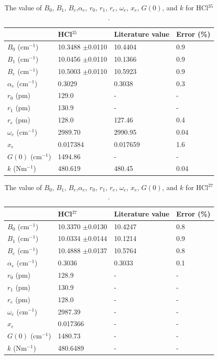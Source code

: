 \documentclass[twocolumn]{article} %
\begin{document}
\begin{table}[h]
    \caption{The value of $B_0$, $B_1$, $B_e$,$\alpha_e$, $r_0$, $r_1$, $r_e$, $\omega_e$, $x_e$, $G(0)$, and $k$ for HCl$^{35}$.}
    \begin{tabular}{L{.7in}C{.7in}C{.7in}C{.7in}}\toprule
          & HCl$^{35}$& Literature value & Error (\%) \\\midrule
        $B_0$ (cm$^{-1}$)& 10.3488 $\pm$0.0110 & 10.4404 \cite{HCl35-37}  & 0.9\\
        $B_1$ (cm$^{-1}$)& 10.0456 $\pm$0.0110& 10.1366 \cite{HCl35-37}& 0.9\\
        $B_e$ (cm$^{-1}$)& 10.5003 $\pm$0.0110& 10.5923 \cite{HCl35-37}& 0.9\\
        $\alpha_e$ (cm$^{-1}$)& 0.3029 & 0.3038\cite{HCl35-37} & 0.3\\
        $r_0$ (pm)& 129.0 & - & -\\
        $r_1$ (pm)& 130.9 & - & -\\
        $r_e$ (pm)& 128.0 & 127.46 \cite{HClbook} & 0.4\\
        $\omega_e$ (cm$^{-1}$)& 2989.70 &  2990.95 \cite{HClbook}& 0.04\\
        $x_e$ & 0.017384 & 0.017659 \cite{HClbook} & 1.6 \\
        $G(0)$ (cm$^{-1}$)& 1494.86 &- &-\\
        $k$ (Nm$^{-1}$)& 480.619 & 480.45 \cite{HClbook} & 0.04\\\bottomrule
    \end{tabular}
\end{table}

\begin{table}[h]
    \caption{The value of $B_0$, $B_1$, $B_e$,$\alpha_e$, $r_0$, $r_1$, $r_e$, $\omega_e$, $x_e$, $G(0)$, and $k$ for HCl$^{37}$.}
    \begin{tabular}{L{.7in}C{.7in}C{.7in}C{.7in}}\toprule
          & HCl$^{37}$& Literature value & Error (\%) \\\midrule
        $B_0$ (cm$^{-1}$)& 10.3370 $\pm$0.0130& 10.4247\cite{HCl35-37}  &0.8\\
        $B_1$ (cm$^{-1}$)& 10.0334 $\pm$0.0144 & 10.1214\cite{HCl35-37} &0.9\\
        $B_e$ (cm$^{-1}$)& 10.4888 $\pm$0.0137& 10.5764\cite{HCl35-37} &0.8\\
        $\alpha_e$ (cm$^{-1}$)& 0.3036 & 0.3033\cite{HCl35-37} &0.1\\
        $r_0$ (pm)& 128.9 &  -&-\\
        $r_1$ (pm)& 130.9 &  -&-\\
        $r_e$ (pm)& 128.0 & -&-\\
        $\omega_e$ (cm$^{-1}$)& 2987.39 &  -&-\\
        $x_e$ & 0.017366 & - &-\\
        $G(0)$ (cm$^{-1}$)& 1480.73 &- &-\\
        $k$ (Nm$^{-1}$)& 480.6489 &  -&-\\\bottomrule
    \end{tabular}
\end{table}
\end{document}
